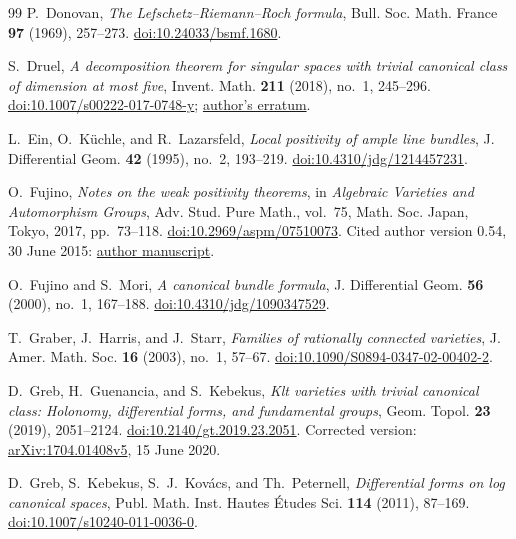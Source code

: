 \begin{thebibliography}{99}
P.~Donovan, \emph{The Lefschetz--Riemann--Roch formula},
Bull. Soc. Math. France \textbf{97} (1969), 257--273.
\href{https://doi.org/10.24033/bsmf.1680}{doi:10.24033/bsmf.1680}.

S.~Druel, \emph{A decomposition theorem for singular spaces with trivial
canonical class of dimension at most five},
Invent. Math. \textbf{211} (2018), no.~1, 245--296.
\href{https://doi.org/10.1007/s00222-017-0748-y}{doi:10.1007/s00222-017-0748-y};
\href{https://druel.perso.math.cnrs.fr/textes/bobo_erratum.pdf}{author's erratum}.

L.~Ein, O.~K\"uchle, and R.~Lazarsfeld,
\emph{Local positivity of ample line bundles},
J. Differential Geom. \textbf{42} (1995), no.~2, 193--219.
\href{https://doi.org/10.4310/jdg/1214457231}{doi:10.4310/jdg/1214457231}.

O.~Fujino, \emph{Notes on the weak positivity theorems},
in \emph{Algebraic Varieties and Automorphism Groups},
Adv. Stud. Pure Math., vol.~75, Math. Soc. Japan, Tokyo, 2017, pp.~73--118.
\href{https://doi.org/10.2969/aspm/07510073}{doi:10.2969/aspm/07510073}.
Cited author version 0.54, 30 June 2015:
\href{https://www.math.kyoto-u.ac.jp/~fujino/weak-posi11.pdf}{author manuscript}.

O.~Fujino and S.~Mori, \emph{A canonical bundle formula},
J. Differential Geom. \textbf{56} (2000), no.~1, 167--188.
\href{https://doi.org/10.4310/jdg/1090347529}{doi:10.4310/jdg/1090347529}.

T.~Graber, J.~Harris, and J.~Starr,
\emph{Families of rationally connected varieties},
J. Amer. Math. Soc. \textbf{16} (2003), no.~1, 57--67.
\href{https://doi.org/10.1090/S0894-0347-02-00402-2}{doi:10.1090/S0894-0347-02-00402-2}.

D.~Greb, H.~Guenancia, and S.~Kebekus,
\emph{Klt varieties with trivial canonical class: Holonomy, differential forms, and fundamental groups},
Geom. Topol. \textbf{23} (2019), 2051--2124.
\href{https://doi.org/10.2140/gt.2019.23.2051}{doi:10.2140/gt.2019.23.2051}.
Corrected version: \href{https://arxiv.org/abs/1704.01408v5}{arXiv:1704.01408v5},
15 June 2020.

D.~Greb, S.~Kebekus, S.~J.~Kov\'acs, and Th.~Peternell,
\emph{Differential forms on log canonical spaces},
Publ. Math. Inst. Hautes \'Etudes Sci. \textbf{114} (2011), 87--169.
\href{https://doi.org/10.1007/s10240-011-0036-0}{doi:10.1007/s10240-011-0036-0}.


\end{thebibliography}
